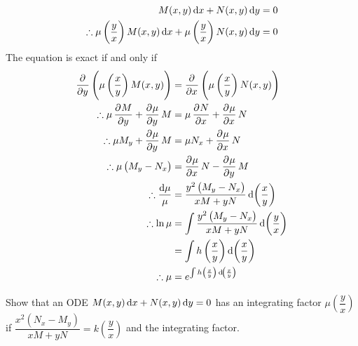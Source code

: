 \documentclass[fleqn, a4paper, 12pt, oneside]{amsart}
\theoremstyle{definition}
\theoremstyle{theorem}
\begin{document}
\begin{solution}
	\begin{align*}
		M(x,y) \dif x + N(x,y) \dif y &= 0\\
		\therefore \mu \left( \dfrac{y}{x} \right) M(x,y) \dif x + \mu \left( \dfrac{y}{x} \right) N(x,y) \dif y &= 0
	\end{align*}
	The equation is exact if and only if
	\begin{align*}
		\dpd{}{y} \left( \mu \left( \dfrac{x}{y} \right) M(x,y) \right) &= \dpd{}{x} \left( \mu \left( \dfrac{x}{y} \right) N(x,y) \right)\\
		\therefore \mu \dpd{M}{y} + \dpd{\mu}{y} M &= \mu \dpd{N}{x} + \dpd{\mu}{x} N\\
		\therefore \mu M_y + \dpd{\mu}{y} M &= \mu N_x + \dpd{\mu}{x} N\\
		\therefore \mu \left( M_y - N_x \right) &= \dpd{\mu}{x} N - \dpd{\mu}{y} M\\
		\therefore \dfrac{\dif \mu}{\mu} &= \dfrac{y^2 \left( M_y - N_x \right)}{xM + yN} \dif \left( \dfrac{x}{y} \right)\\
		\therefore \ln \mu &= \int \dfrac{y^2 \left( M_y - N_x \right)}{xM + yN} \dif \left( \dfrac{y}{x} \right)\\
		&= \int h \left( \dfrac{x}{y} \right) \dif \left( \dfrac{x}{y} \right)\\
		\therefore \mu &= e^{\int h \left( \frac{x}{y} \right) \dif \left( \frac{x}{y} \right)}
	\end{align*}
\end{solution}

\begin{question}
	Show that an ODE $M(x,y) \dif x + N(x,y) \dif y = 0$ has an integrating factor $\mu \left( \dfrac{y}{x} \right)$ if $\dfrac{x^2 \left( N_x - M_y \right)}{xM + yN} = k \left( \dfrac{y}{x} \right)$ and the integrating factor.
\end{question}
\end{document}

